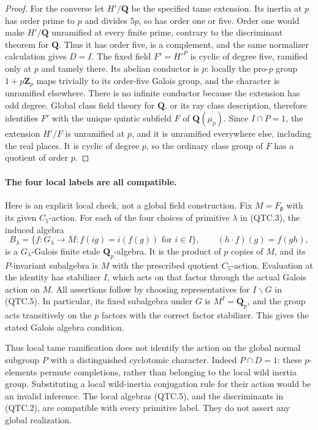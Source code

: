 \begin{proof}
For the converse let $H'/\mathbf Q$ be the specified tame extension.
Its inertia at $p$ has order prime to $p$ and divides $5p$, so has
order one or five.  Order one would make $H'/\mathbf Q$ unramified
at every finite prime, contrary to the discriminant theorem for
$\mathbf Q$.  Thus it has order five, is a complement, and the
same normalizer calculation gives $D=I$.
The fixed field $F'=H'^P$ is cyclic of degree five, ramified only
at $p$ and tamely there.  Its abelian conductor is $p$:
locally the pro-$p$ group $1+p\mathbf Z_p$ maps trivially to its
order-five Galois group, and the character is unramified elsewhere.
There is no infinite conductor because the extension has odd degree.
Global class field theory for $\mathbf Q$, or its ray class description,
therefore identifies $F'$ with the unique quintic subfield $F$ of
$\mathbf Q(\mu_p)$.  Since $I\cap P=1$, the extension $H'/F$
is unramified at $p$, and it is unramified everywhere else, including
the real places.  It is cyclic of degree $p$, so the ordinary class
group of $F$ has a quotient of order $p$.
\end{proof}

\paragraph{The four local labels are all compatible.}
Here is an explicit local check, not a global field construction.
Fix $M=F_{\mathfrak p}$ with its given $C_5$-action.  For each of the
four choices of primitive $\lambda$ in (QTC.3), the induced algebra
\[
 B_\lambda=
 \{f:G_\lambda\to M:f(ig)=i(f(g))\text{ for }i\in I\},
 \qquad (h\cdot f)(g)=f(gh),                          \tag{QTC.5}
\]
is a $G_\lambda$-Galois finite etale $\mathbf Q_p$-algebra.
It is the product of $p$ copies of $M$, and its $P$-invariant
subalgebra is $M$ with the prescribed quotient $C_5$-action.
Evaluation at the identity has stabilizer $I$, which acts on that
factor through the actual Galois action on $M$.
All assertions follow by choosing representatives for $I\backslash G$
in (QTC.5).  In particular, its fixed subalgebra under $G$ is
$M^I=\mathbf Q_p$, and the group acts transitively on the $p$ factors
with the correct factor stabilizer.  This gives the stated Galois
algebra condition.

Thus local tame ramification does not identify the action on the
global normal subgroup $P$ with a distinguished cyclotomic character.
Indeed $P\cap D=1$: these $p$-elements permute completions, rather
than belonging to the local wild inertia group.  Substituting a
local wild-inertia conjugation rule for their action would be an
invalid inference.  The local algebras (QTC.5), and the discriminants
in (QTC.2), are compatible with every primitive label.  They do not
assert any global realization.


